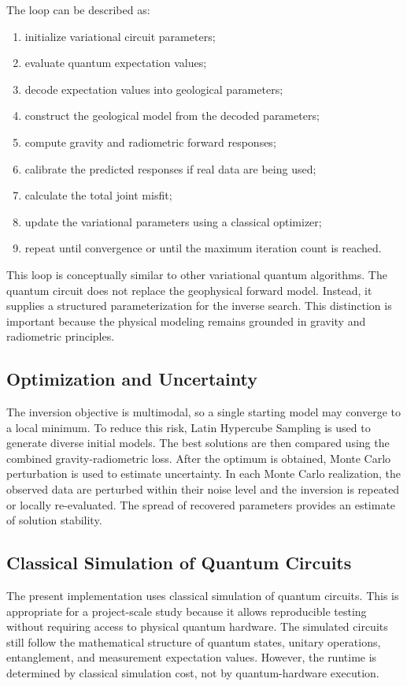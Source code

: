 \documentclass[12pt,a4paper]{article}
\begin{document}
The loop can be described as:
\begin{enumerate}
    \item initialize variational circuit parameters;
    \item evaluate quantum expectation values;
    \item decode expectation values into geological parameters;
    \item construct the geological model from the decoded parameters;
    \item compute gravity and radiometric forward responses;
    \item calibrate the predicted responses if real data are being used;
    \item calculate the total joint misfit;
    \item update the variational parameters using a classical optimizer;
    \item repeat until convergence or until the maximum iteration count is reached.
\end{enumerate}

This loop is conceptually similar to other variational quantum algorithms. The quantum circuit does not replace the geophysical forward model. Instead, it supplies a structured parameterization for the inverse search. This distinction is important because the physical modeling remains grounded in gravity and radiometric principles.

\subsection{Optimization and Uncertainty}
The inversion objective is multimodal, so a single starting model may converge to a local minimum. To reduce this risk, Latin Hypercube Sampling is used to generate diverse initial models. The best solutions are then compared using the combined gravity-radiometric loss. After the optimum is obtained, Monte Carlo perturbation is used to estimate uncertainty. In each Monte Carlo realization, the observed data are perturbed within their noise level and the inversion is repeated or locally re-evaluated. The spread of recovered parameters provides an estimate of solution stability.

\subsection{Classical Simulation of Quantum Circuits}
The present implementation uses classical simulation of quantum circuits. This is appropriate for a project-scale study because it allows reproducible testing without requiring access to physical quantum hardware. The simulated circuits still follow the mathematical structure of quantum states, unitary operations, entanglement, and measurement expectation values. However, the runtime is determined by classical simulation cost, not by quantum-hardware execution.
\end{document}
